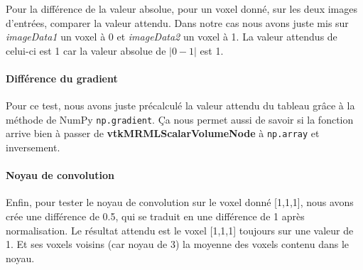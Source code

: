 \documentclass{article}
\newcommand{\subsubsubsection}[1]{\paragraph{#1}\par\noindent\bigskip}
\begin{document}
{{{            Pour la différence de la valeur absolue, pour un voxel donné, sur les deux images d'entrées, comparer la valeur attendu. Dans notre cas nous avons juste mis sur \textit{imageData1} un voxel à 0 et \textit{imageData2} un voxel à 1. La valeur attendus de celui-ci est 1 car la valeur absolue de $|0 - 1|$ est 1.

            \subsubsubsection{Différence du gradient}

            Pour ce test, nous avons juste précalculé la valeur attendu du tableau grâce à la méthode de NumPy \texttt{np.gradient}. Ça nous permet aussi de savoir si la fonction arrive bien à passer de \textbf{vtkMRMLScalarVolumeNode} à \texttt{np.array} et inversement.

            \subsubsubsection{Noyau de convolution}

            Enfin, pour tester le noyau de convolution sur le voxel donné [1,1,1], nous avons crée une différence de 0.5, qui se traduit en une différence de 1 après normalisation. Le résultat attendu est le voxel [1,1,1] toujours sur une valeur de 1. Et ses voxels voisins (car noyau de 3) la moyenne des voxels contenu dans le noyau.
        }
    }

    \newpage
}
\end{document}
